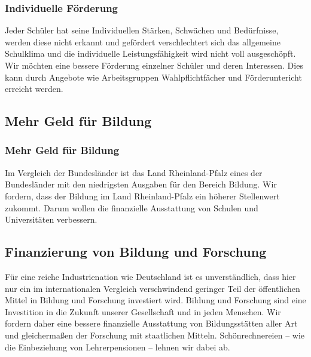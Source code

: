 \subsubsection{Individuelle Förderung}
\abstimmung
Jeder Schüler hat seine Individuellen Stärken, Schwächen und Bedürfnisse, werden diese nicht erkannt und gefördert verschlechtert sich das allgemeine Schulklima und die individuelle Leistungsfähigkeit wird nicht voll ausgeschöpft. Wir möchten eine bessere Förderung einzelner Schüler und deren Interessen. Dies kann durch Angebote wie Arbeitsgruppen Wahlpflichtfächer und Förderuntericht erreicht werden.
 
\newpage
\subsection*{Mehr Geld für Bildung}
\label{wp:bildung:geld1}

\subsubsection{Mehr Geld für Bildung}
\abstimmung
Im Vergleich der Bundesländer ist das Land Rheinland-Pfalz eines der Bundesländer mit den niedrigsten Ausgaben für den Bereich Bildung. Wir fordern, dass der Bildung im Land Rheinland-Pfalz ein höherer Stellenwert zukommt. Darum wollen die finanzielle Ausstattung von Schulen und Universitäten verbessern.
 
\label{wp:bildung:geld2}

\subsection*{Finanzierung von Bildung und Forschung}
\abstimmung
Für eine reiche Industrienation wie Deutschland ist es unverständlich, dass hier nur ein im internationalen Vergleich verschwindend geringer Teil der öffentlichen Mittel in Bildung und Forschung investiert wird. Bildung und Forschung sind eine Investition in die Zukunft unserer Gesellschaft und in jeden Menschen. Wir fordern daher eine bessere finanzielle Ausstattung von Bildungsstätten aller Art und gleichermaßen der Forschung mit staatlichen Mitteln. Schönrechnereien – wie die Einbeziehung von Lehrerpensionen – lehnen wir dabei ab.
 
